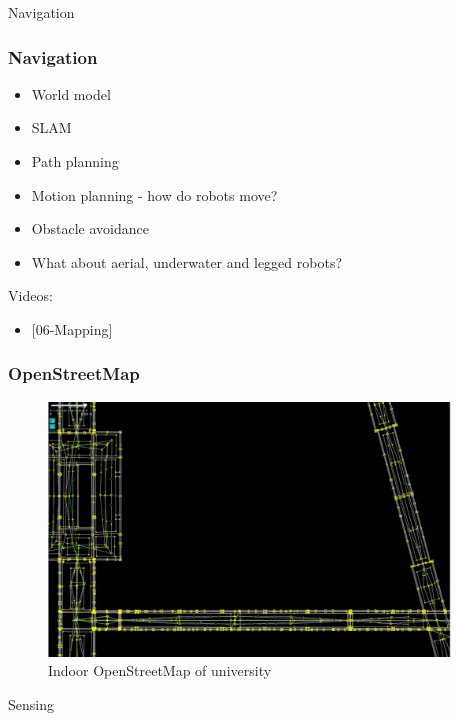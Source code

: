 \documentclass{beamer}
\begin{document}
\begin{frame}[standout]
     Navigation
\end{frame}


\begin{frame}
\frametitle{Navigation}
\begin{itemize}
    \item <1->World model
    \item <2->SLAM
    \item <3->Path planning
    \item <4->Motion planning - how do robots move?
    \item <5->Obstacle avoidance
    \item <6->What about aerial, underwater and legged robots?
\end{itemize}

{\footnotesize
Videos:
\begin{itemize}
\item <2->{[06-Mapping]}
\end{itemize}}
\end{frame}

\begin{frame}
\frametitle{OpenStreetMap}
\begin{figure}[H]
     \centering
     \includegraphics[width=0.95\textwidth]{images/OSM.png}
     \caption{Indoor OpenStreetMap of university~\cite{Naik2019}}
     \label{fig:pick}
\end{figure}
\end{frame}

\begin{frame}[standout]
     Sensing
\end{frame}
\end{document}
